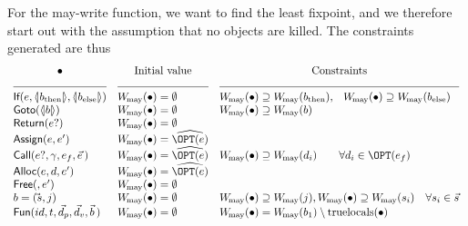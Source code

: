 \begin{docpart}
For the may-write function, we want to find the least fixpoint, and we
therefore start out with the assumption that no objects are killed.
The constraints generated are thus
\[
\begin{array}{lll}
  \hfil \bullet & \hfil \mbox{Initial value} & \hfil \mbox{Constraints} \\
  \hrulefill & \hrulefill & \hrulefill \\
  \cons{If}(e,\coreXref{b_{\mathrm{then}}},
  \coreXref{b_{\mathrm{else}}}) & \Wmay(\bullet) = \emptyset & \Wmay(\bullet) \supseteq
  \Wmay(b_{\mathrm{then}}) ,\hfil \Wmay(\bullet) \supseteq
  \Wmay(b_{\mathrm{else}}) \\
  \cons{Goto}(\coreXref b) & \Wmay(\bullet) = \emptyset & \Wmay(\bullet) \supseteq \Wmay(b) \\
  \cons{Return}(e?) & \Wmay(\bullet) = \emptyset &  \\
  \cons{Assign}(e,e') & \Wmay(\bullet) = \subdecl{\OPT(e)} & \\
  \cons{Call}(e?,\gamma,e_f,\vec e\,)
  & \Wmay(\bullet) = \subdecl{\OPT(e)}
  & \Wmay(\bullet) \supseteq \Wmay(d_i) \qquad \forall d_i \in
  \OPT(e_f)  \\ 
  \cons{Alloc}(e,d,e') & \Wmay(\bullet) = \subdecl{\OPT(e)} \\ 
  \cons{Free}(,e') & \Wmay(\bullet) = \emptyset \\
  b = (\vec s,j) & \Wmay(\bullet) = \emptyset & \Wmay(\bullet) \supseteq
  \Wmay(j) , \Wmay(\bullet) \supseteq \Wmay(s_i) \quad
  \forall s_i \in \vec s  \\
  \cons{Fun}(id,t,\vec d_p,\vec d_v,\vec b\,)
  & \Wmay(\bullet) = \emptyset & \Wmay(\bullet) = \Wmay(b_1) \setminus
  \trulylocal(\bullet) \\
\end{array}
\]


\end{docpart}

